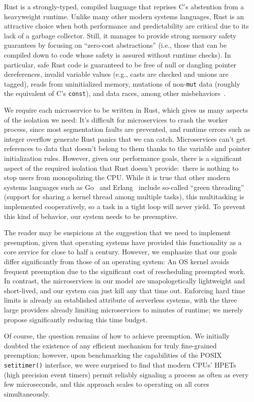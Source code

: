 Rust is a strongly-typed, compiled language that reprises C's abstention from a
heavyweight runtime.  Unlike many other modern systems languages, Rust is an
attractive choice when both performance and predictability are critical due to its
lack of a garbage collector.  Still, it manages to provide strong memory safety
guarantees by focusing on ``zero-cost abstractions'' (i.e., those that can be
compiled down to code whose safety is assured without runtime checks).  In
particular, safe Rust code is guaranteed to be free of null or dangling pointer
dereferences, invalid variable values (e.g., casts are checked and unions are
tagged), reads from uninitialized memory, mutations of non-\texttt{mut} data (roughly
the equivalent of C's \texttt{const}), and data races, among other
misbehaviors~\cite{www-rustlang-ub}.

We require each microservice to be written in Rust, which gives us many aspects of
the isolation we need:  It's difficult for microservices to crash the worker process,
since most segmentation faults are prevented, and runtime errors such as integer
overflow generate Rust panics that we can catch.  Microservices can't get references
to data that doesn't belong to them thanks to the variable and pointer initialization
rules.  However, given our performance goals, there is a significant aspect of the
required isolation that Rust doesn't provide:\ there is nothing to stop users from
monopolizing the CPU.  While it is true that other modern systems languages such as
Go~\cite{www-golang} and Erlang~\cite{www-erlang} include so-called ``green
threading'' (support for sharing a kernel thread among multiple tasks), this
multitasking is implemented cooperatively, so a task in a tight loop will never
yield.  To prevent this kind of behavior, our system needs to be preemptive.

The reader may be suspicious at the suggestion that we need to implement preemption,
given that operating systems have provided this functionality as a core service for
close to half a century.  However, we emphasize that our goals differ significantly
from those of an operating system:  An OS kernel avoids frequent preemption due to
the significant cost of rescheduling preempted work.  In contrast, the microservices
in our model are unapologetically lightweight and short-lived, and our system can
just kill any that time out.  Enforcing hard time limits is already an established
attribute of serverless systems, with the three large providers already limiting
microservices to minutes of runtime; we merely propose significantly reducing this
time budget.

Of course, the question remains of how to achieve preemption.  We initially doubted
the existence of any efficient mechanism for truly fine-grained preemption; however,
upon benchmarking the capabilities of the POSIX \texttt{setitimer()} interface, we
were surprised to find that modern CPUs' HPETs (high precision event timers) permit
reliably signaling a process as often as every few microseconds, and this approach
scales to operating on all cores simultaneously.
